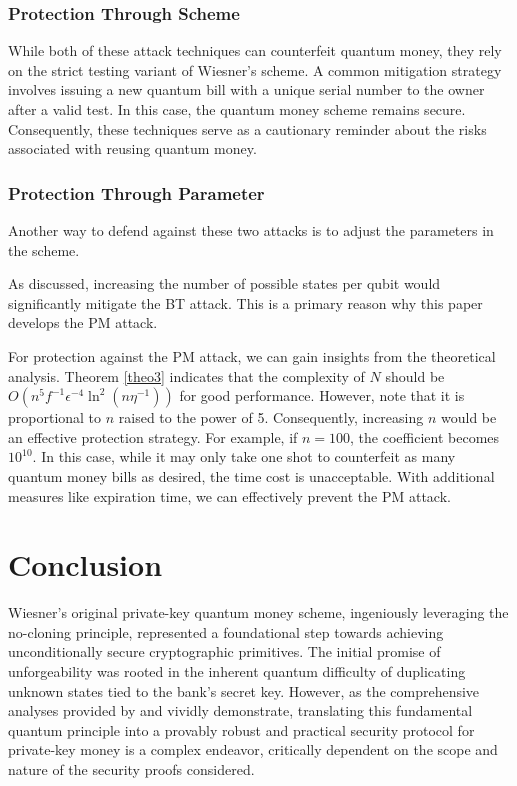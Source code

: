\documentclass{article} %
\begin{document}
\subsubsection{Protection Through Scheme}
While both of these attack techniques can counterfeit quantum money, they rely on the strict testing variant of Wiesner’s scheme. A common mitigation strategy involves issuing a new quantum bill with a unique serial number to the owner after a valid test. In this case, the quantum money scheme remains secure. Consequently, these techniques serve as a cautionary reminder about the risks associated with reusing quantum money.

\subsubsection{Protection Through Parameter}
Another way to defend against these two attacks is to adjust the parameters in the scheme.

As discussed, increasing the number of possible states per qubit would significantly mitigate the BT attack. This is a primary reason why this paper develops the PM attack.

For protection against the PM attack, we can gain insights from the theoretical analysis. Theorem \ref{theo3} indicates that the complexity of \( N \) should be \( O\left(n^5 f^{-1} \epsilon^{-4} \ln^2(n \eta^{-1})\right) \) for good performance. However, note that it is proportional to \( n \) raised to the power of 5. Consequently, increasing \( n \) would be an effective protection strategy. For example, if \( n = 100 \), the coefficient becomes \( 10^{10} \). In this case, while it may only take one shot to counterfeit as many quantum money bills as desired, the time cost is unacceptable. With additional measures like expiration time, we can effectively prevent the PM attack.

\newpage
\section{Conclusion}
Wiesner's original private-key quantum money scheme, ingeniously leveraging the no-cloning principle, represented a foundational step towards achieving unconditionally secure cryptographic primitives. The initial promise of unforgeability was rooted in the inherent quantum difficulty of duplicating unknown states tied to the bank's secret key. However, as the comprehensive analyses provided by \citet{Molina2012Optimal} and \citet{Nagaj2016Adaptive} vividly demonstrate, translating this fundamental quantum principle into a provably robust and practical security protocol for private-key money is a complex endeavor, critically dependent on the scope and nature of the security proofs considered.
\end{document}
